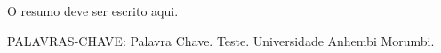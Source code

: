 

\setlength{\absparsep}{18pt} %
\begin{resumo}
	O resumo deve ser escrito aqui.

 PALAVRAS-CHAVE: Palavra Chave. Teste. Universidade Anhembi Morumbi.
\end{resumo}
